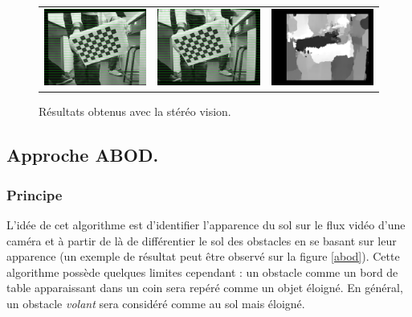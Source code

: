 \documentclass{article}
\begin{document}
\begin{figure}
\begin{center}
\begin{tabular}{ccc}
            \includegraphics[width=0.3\linewidth]{rcs/rem2l.png} & \includegraphics[width=0.3\linewidth]{rcs/rem2r.png} & \includegraphics[width=0.3\linewidth]{rcs/disp2.png} \\
        \end{tabular}
    \end{center}
    \caption{Résultats obtenus avec la stéréo vision.}
    \label{disp_result}
\end{figure}

\subsection{Approche ABOD.}
\subsubsection{Principe} L'idée de cet algorithme est d'identifier l'apparence du sol sur le flux vidéo d'une caméra et à partir de là de différentier le sol des obstacles en se basant sur leur apparence (un exemple de résultat peut être observé sur la figure \ref{abod}). Cette algorithme possède quelques limites cependant : un obstacle comme un bord de table apparaissant dans un coin sera repéré comme un objet éloigné. En général, un obstacle \emph{volant} sera considéré comme au sol mais éloigné.
\end{document}
